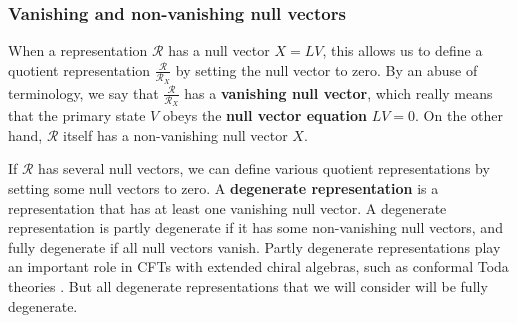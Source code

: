 \documentclass[12pt, a4paper]{article}
\theoremstyle{break}
\begin{document}
\subsubsection{Vanishing and non-vanishing null vectors}

When a representation $\mathcal{R}$ has a null vector $X{}=LV{}$, this allows us to define a quotient representation $\frac{\mathcal{R}}{\mathcal{R}_{X{}}}$ by setting the null vector to zero. 
By an abuse of terminology, we say that $\frac{\mathcal{R}}{\mathcal{R}_{X{}}}$ has a \textbf{vanishing null vector}, which really means that the primary state $V{}$ obeys the \textbf{null vector equation} $LV{}=0$. On the other hand, $\mathcal{R}$ itself has a non-vanishing null vector $X{}$. 

If $\mathcal{R}$ has several null vectors, we can define various quotient representations by setting some null vectors to zero. A \textbf{degenerate representation} is a representation that has at least one vanishing null vector. A degenerate representation is partly degenerate if it has some non-vanishing null vectors, and fully degenerate if all null vectors vanish. Partly degenerate representations play an important role in CFTs with extended chiral algebras, such as conformal Toda theories \cite{fl07c}. But all degenerate representations that we will consider will be fully degenerate. 
\end{document}
